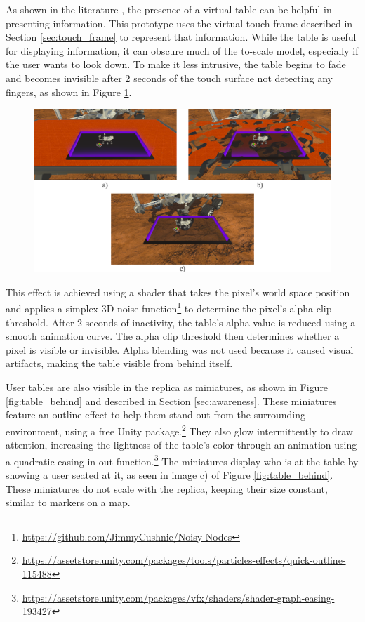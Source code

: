         As shown in the literature \cite{zielaskoMenusDeskSystem2019, sousaVRRRRoomVirtualReality2017, zielaskoNonStationaryOfficeDesk2019}, the presence of a virtual table can be helpful in presenting information. This prototype uses the virtual touch frame described in Section \ref{sec:touch_frame} to represent that information. While the table is useful for displaying information, it can obscure much of the to-scale model, especially if the user wants to look down. To make it less intrusive, the table begins to fade and becomes invisible after 2 seconds of the touch surface not detecting any fingers, as shown in Figure \ref{fig:table_visibility}.

        \begin{figure}[h!]
            \centering
            \includegraphics[width=1\textwidth]{figures/table_visibility.png}
            \label{fig:table_visibility}
        \end{figure}

        This effect is achieved using a shader that takes the pixel's world space position and applies a simplex 3D noise function\footnote{\url{https://github.com/JimmyCushnie/Noisy-Nodes}} to determine the pixel's alpha clip threshold. After 2 seconds of inactivity, the table's alpha value is reduced using a smooth animation curve. The alpha clip threshold then determines whether a pixel is visible or invisible. Alpha blending was not used because it caused visual artifacts, making the table visible from behind itself.

        User tables are also visible in the replica as miniatures, as shown in Figure \ref{fig:table_behind} and described in Section \ref{sec:awareness}. These miniatures feature an outline effect to help them stand out from the surrounding environment, using a free Unity package.\footnote{\url{https://assetstore.unity.com/packages/tools/particles-effects/quick-outline-115488}} They also glow intermittently to draw attention, increasing the lightness of the table's color through an animation using a quadratic easing in-out function.\footnote{\url{https://assetstore.unity.com/packages/vfx/shaders/shader-graph-easing-193427}} The miniatures display who is at the table by showing a user seated at it, as seen in image c) of Figure \ref{fig:table_behind}. These miniatures do not scale with the replica, keeping their size constant, similar to markers on a map.

